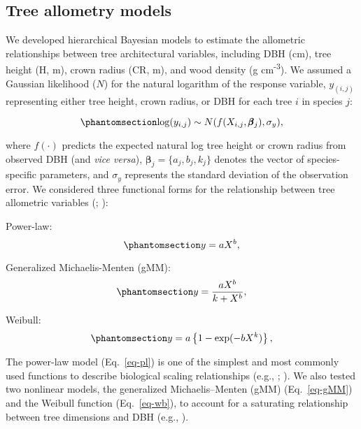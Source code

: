 \documentclass[
  12pt,
  letterpaper,
  DIV=11,
  numbers=noendperiod]{scrartcl}
\begin{document}
\subsection{Tree allometry models}\label{tree-allometry-models}

We developed hierarchical Bayesian models to estimate the allometric
relationships between tree architectural variables, including DBH (cm),
tree height (H, m), crown radius (CR, m), and wood density (g
cm\textsuperscript{-3}). We assumed a Gaussian likelihood (\(N\)) for
the natural logarithm of the response variable, \(y_{(i,j)}\)
representing either tree height, crown radius, or DBH for each tree
\(i\) in species \(j\):

\begin{equation}\phantomsection\label{eq-like}{
\log(y_{i,j}) \sim N(f(X_{i,j}, \pmb{\beta}_{j}), \sigma_y),
}\end{equation}

where \(f(\cdot)\) predicts the expected natural log tree height or
crown radius from observed DBH (and \emph{vice versa}),
\(\pmb{\beta}_{j}=\{a_j, b_j, k_j\}\) denotes the vector of
species-specific parameters, and \(\sigma_y\) represents the standard
deviation of the observation error. We considered three functional forms
for the relationship between tree allometric variables
(;
):

Power-law: \begin{equation}\phantomsection\label{eq-pl}{
y = aX^b,
}\end{equation}

Generalized Michaelis-Menten (gMM):
\begin{equation}\phantomsection\label{eq-gMM}{
y = \frac{aX^b}{k + X^b},
}\end{equation}

Weibull: \begin{equation}\phantomsection\label{eq-wb}{
y = a\left\{1-\mathrm{exp}(-bX^k)\right\},
}\end{equation}

The power-law model (Eq.~\ref{eq-pl}) is one of the simplest and most
commonly used functions to describe biological scaling relationships
(e.g., ;
). We also tested two
nonlinear models, the generalized Michaelis--Menten (gMM)
(Eq.~\ref{eq-gMM}) and the Weibull function (Eq.~\ref{eq-wb}), to
account for a saturating relationship between tree dimensions and DBH
(e.g., ).
\end{document}
